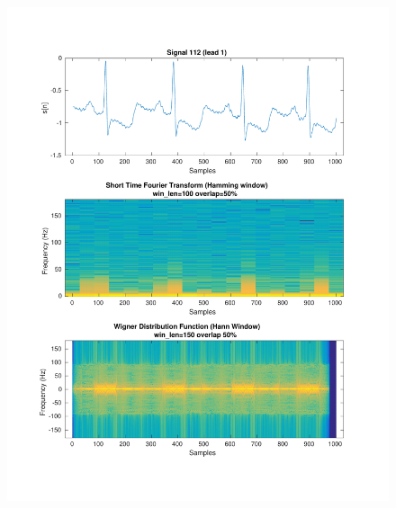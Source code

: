 \documentclass[11pt,a4paper]{article}
\begin{document}
\begin{figure}[H]
\centering
\begin{minipage}{0.48\textwidth}
	\centering
	\includegraphics[width=\textwidth]{fig/112l1_stft_wdf.pdf}
	

\end{minipage}
\end{figure}
\end{document}
